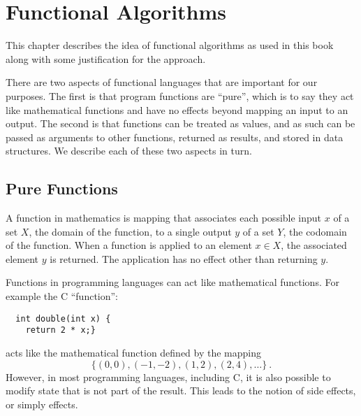 \chapter{Functional Algorithms}
\label{ch:language::functional-algorithms}


\begin{preamble}
This chapter describes the idea of functional algorithms as used in
this book along with some justification for the approach.
\end{preamble}

\begin{gram}
There are two aspects of functional languages that are important for
our purposes.   The first is that program functions are ``pure'',
which is to say they act like mathematical functions and have no
effects beyond mapping an input to an output.    The second is that
functions can be treated as values, and as such can be passed as
arguments to other functions, returned as results, and stored in data
structures.  We describe each of these two aspects in turn.
\end{gram}

\section{Pure Functions}

\begin{gram}
A function in mathematics is mapping that associates each
possible input $x$ of a set $X$, the domain of the function, to a
single output $y$ of a set $Y$, the codomain of the function.
When a function is applied to an element $x \in X$, the associated
element $y$ is returned.     The application has no effect other than
returning $y$.

Functions in programming languages can act like mathematical functions.   For
example the C ``function'':
\begin{verbatim}
  int double(int x) { 
    return 2 * x;}
\end{verbatim}
acts like the mathematical function defined by the mapping \[\{(0,0), (-1, -2), (1,2), (2, 4),
  \ldots\}~.\]    However, in most programming languages, including C, it is also 
possible to modify state that is not part of the result.    This leads
to the notion of side effects, or simply effects.
\end{gram}

